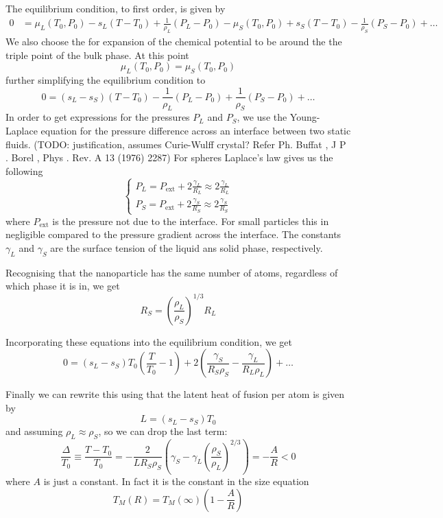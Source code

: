 The equilibrium condition, to first order, is given by
\begin{align*}
0 &= \mu_L(T_0,P_0) - s_L(T-T_0) + \frac{1}{\rho_L}(P_L-P_0) - \mu_S(T_0,P_0) + s_S(T-T_0) - \frac{1}{\rho_S}(P_S-P_0) + \ldots
\end{align*}
We also choose the for expansion of the chemical potential to be around the the triple point of the bulk phase. At this point
\[ \mu_L(T_0,P_0) = \mu_S(T_0,P_0) \]
further simplifying the equilibrium condition to
\[ 0 =  (s_L-s_S)(T-T_0) - \frac{1}{\rho_L}(P_L-P_0) + \frac{1}{\rho_S}(P_S-P_0) + \ldots \]
In order to get expressions for the pressures $P_L$ and $P_S$, we use the Young-Laplace equation for the pressure difference across an interface between two static fluids. (TODO: justification, assumes Curie-Wulff crystal? Refer Ph. Buffat , J P . Borel , Phys . Rev. A 13 (1976) 2287) For spheres Laplace's law gives us the following
\[ \begin{cases}
P_L = P_\text{ext} + 2 \frac{\gamma_L}{R_L} \approx 2 \frac{\gamma_L}{R_L} \\
P_S = P_\text{ext} + 2 \frac{\gamma_S}{R_S} \approx 2 \frac{\gamma_S}{R_S}
\end{cases} \]
where $P_\text{ext}$ is the pressure not due to the interface. For small particles this in negligible compared to the pressure gradient across the interface. The constants $\gamma_L$ and $\gamma_S$ are the surface tension of the liquid ans solid phase, respectively.

Recognising that the nanoparticle has the same number of atoms, regardless of which phase it is in, we get
\[ R_S = \left(\frac{\rho_L}{\rho_S}\right)^{1/3}R_L \]

Incorporating these equations into the equilibrium condition, we get
\[ 0 = (s_L-s_S)T_0 \left(\frac{T}{T_0}-1\right) + 2 \left(\frac{\gamma_S}{R_S\rho_S}- \frac{\gamma_L}{R_L\rho_L}\right) + \ldots \]

Finally we can rewrite this using that the latent heat of fusion per atom is given by
\[ L = (s_L-s_S)T_0 \]
and assuming $\rho_L \approx \rho_S$, so we can drop the last term:
\[\frac{\Delta}{T_0} \equiv \frac{T-T_0}{T_0} = - \frac{2}{LR_S\rho_S}\left(\gamma_S -  \gamma_L \left(\frac{\rho_S}{\rho_L}\right)^{2/3}\right) = - \frac{A}{R} < 0\]
where $A$ is just a constant. In fact it is the constant in the size equation
\[ T_M(R) = T_M(\infty)\left(1- \frac{A}{R}\right) \]

